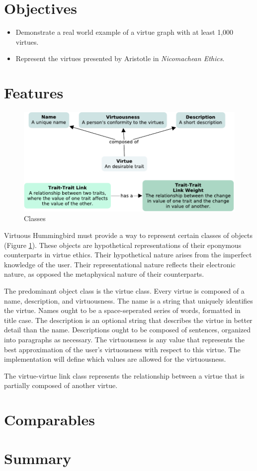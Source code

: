 \documentclass{article}
\newcommand{\name}{Virtuous Hummingbird}
\begin{document}
\section{Objectives}

\begin{itemize}
    \item Demonstrate a real world example of a virtue graph with at least 1,000 virtues.
    \item Represent the virtues presented by Aristotle in \textit{Nicomachean Ethics}.
\end{itemize}

\section{Features}

\begin{figure}[h]
    \includegraphics[width=\linewidth]{classes.pdf}
    \caption{Classes}
    \label{fig:classes}
\end{figure}

\name{} must provide a way to represent certain classes of objects (Figure \ref{fig:classes}).
These objects are hypothetical representations of their eponymous counterparts in virtue ethics.
Their hypothetical nature arises from the imperfect knowledge of the user.
Their representational nature reflects their electronic nature, as opposed the metaphysical nature of their counterparts.

The predominant object class is the virtue class.
Every virtue is composed of a name, description, and virtuousness.
The name is a string that uniquely identifies the virtue.
Names ought to be a space-seperated series of words, formatted in title case.
The description is an optional string that describes the virtue in better detail than the name.
Descriptions ought to be composed of sentences, organized into paragraphs as necessary.
The virtuousness is any value that represents the best approximation of the user's virtuousness with respect to this virtue.
The implementation will define which values are allowed for the virtuousness.

The virtue-virtue link class represents the relationship between a virtue that is partially composed of another virtue.

\section{Comparables}


\section{Summary}

\end{document}
